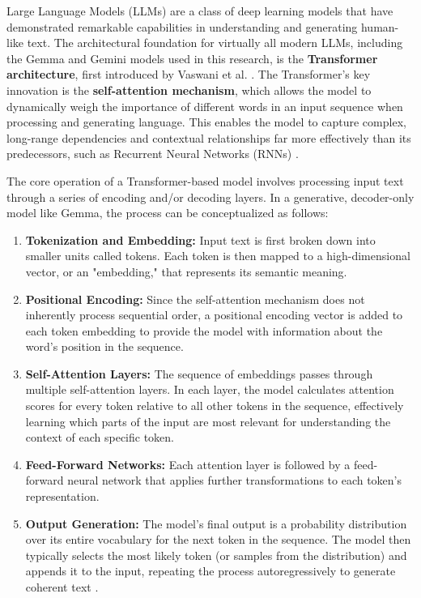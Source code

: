 Large Language Models (LLMs) are a class of deep learning models that have demonstrated remarkable capabilities in understanding and generating human-like text. The architectural foundation for virtually all modern LLMs, including the Gemma and Gemini models used in this research, is the \textbf{Transformer architecture}, first introduced by Vaswani et al. \cite{FIND_CITATION_PLEASE}. The Transformer's key innovation is the \textbf{self-attention mechanism}, which allows the model to dynamically weigh the importance of different words in an input sequence when processing and generating language. This enables the model to capture complex, long-range dependencies and contextual relationships far more effectively than its predecessors, such as Recurrent Neural Networks (RNNs) \cite{FIND_CITATION_PLEASE}.

The core operation of a Transformer-based model involves processing input text through a series of encoding and/or decoding layers. In a generative, decoder-only model like Gemma, the process can be conceptualized as follows:
\begin{enumerate}
    \item \textbf{Tokenization and Embedding:} Input text is first broken down into smaller units called tokens. Each token is then mapped to a high-dimensional vector, or an "embedding," that represents its semantic meaning.
    \item \textbf{Positional Encoding:} Since the self-attention mechanism does not inherently process sequential order, a positional encoding vector is added to each token embedding to provide the model with information about the word's position in the sequence.
    \item \textbf{Self-Attention Layers:} The sequence of embeddings passes through multiple self-attention layers. In each layer, the model calculates attention scores for every token relative to all other tokens in the sequence, effectively learning which parts of the input are most relevant for understanding the context of each specific token.
    \item \textbf{Feed-Forward Networks:} Each attention layer is followed by a feed-forward neural network that applies further transformations to each token's representation.
    \item \textbf{Output Generation:} The model's final output is a probability distribution over its entire vocabulary for the next token in the sequence. The model then typically selects the most likely token (or samples from the distribution) and appends it to the input, repeating the process autoregressively to generate coherent text \cite{FIND_CITATION_PLEASE}.
\end{enumerate}

